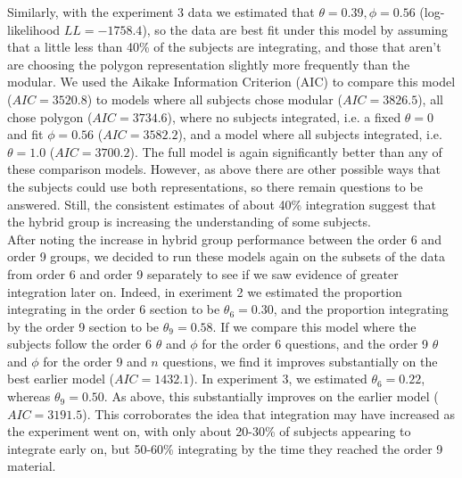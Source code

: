 \documentclass[man,10pt]{apa6}
\begin{document}
Similarly, with the experiment 3 data we estimated that $\theta = 0.39, \phi = 0.56$ (log-likelihood $LL=-1758.4$), so the data are best fit under this model by assuming that a little less than 40\% of the subjects are integrating, and those that aren't are choosing the polygon representation slightly more frequently than the modular. We used the Aikake Information Criterion (AIC) to compare this model ($AIC = 3520.8$) to models where all subjects chose modular ($AIC=3826.5$), all chose polygon ($AIC = 3734.6$), where no subjects integrated, i.e. a fixed $\theta = 0$ and fit $\phi = 0.56$ ($AIC = 3582.2$), and a model where all subjects integrated, i.e. $\theta = 1.0$ ($AIC = 3700.2$). The full model is again significantly better than any of these comparison models. However, as above there are other possible ways that the subjects could use both representations, so there remain questions to be answered. Still, the consistent estimates of about 40\% integration suggest that the hybrid group is increasing the understanding of some subjects.\\
After noting the increase in hybrid group performance between the order 6 and order 9 groups, we decided to run these models again on the subsets of the data from order 6 and order 9 separately to see if we saw evidence of greater integration later on. Indeed, in exeriment 2 we estimated the proportion integrating in the order 6 section to be $\theta_6 = 0.30$, and the proportion integrating by the order 9 section to be $\theta_9 = 0.58$. If we compare this model where the subjects follow the order 6 $\theta$ and $\phi$ for the order 6 questions, and the order 9 $\theta$ and $\phi$ for the order 9 and $n$ questions, we find it improves substantially on the best earlier model ($AIC = 1432.1$). In experiment 3, we estimated $\theta_6 = 0.22$, whereas $\theta_9 = 0.50$. As above, this substantially improves on the earlier model ($AIC=3191.5$). This corroborates the idea that integration may have increased as the experiment went on, with only about 20-30\% of subjects appearing to integrate early on, but 50-60\% integrating by the time they reached the order 9 material.
\end{document}
